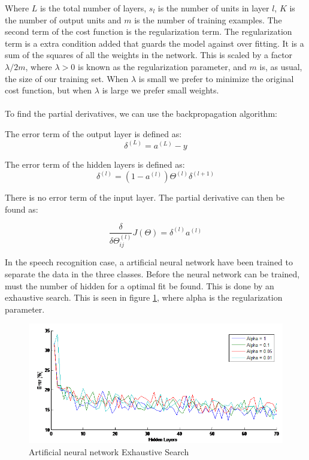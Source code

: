 Where $L$ is the total number of layers, $s_l$ is the number of units in layer $l$, $K$ is the number of output units and $m$ is the number of training examples. The second term of the cost function is the regularization term. The regularization term is a extra condition added that guards the model against over fitting. It is a sum of the squares of all the weights in the network. This is scaled by a factor $\lambda/2m$, where $\lambda>0$ is known as the regularization parameter, and $m$ is, as usual, the size of our training set. When $\lambda$ is small we prefer to minimize the original cost function, but when $\lambda$ is large we prefer small weights.
\\\ \\
To find the partial derivatives, we can use the backpropagation algorithm:

The error term of the output layer is defined as:
\begin{equation}
\delta^{(L)} = a^{(L)}-y
\end{equation}

The error term of the hidden layers is defined as:
\begin{equation}
\delta^{(l)} = (1-a^{(l)})\Theta^{(l)}\delta^{(l+1)}
\end{equation}

There is no error term of the input layer. The partial derivative can then be found as:

\begin{equation}
\frac{\delta}{\delta\Theta^{(l)}_{ij}}J(\Theta) = 
\delta^{(l)}a^{(l)}
\end{equation}

In the speech recognition case, a artificial neural network have been trained to separate the data in the three classes. Before the neural network can be trained, must the number of hidden for a optimal fit be found. This is done by an exhaustive search. This is seen in figure \ref{fig:NNsearch}, where alpha is the regularization parameter.

\begin{figure}[H]
\centering
\includegraphics[scale=0.6]{billeder/TraningErrorNN}
\caption{Artificial neural network Exhaustive Search}
\label{fig:NNsearch}
\end{figure} 

